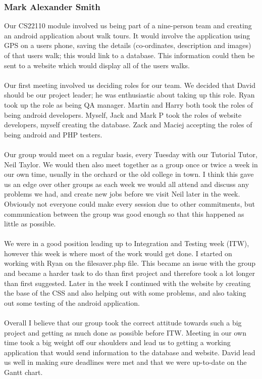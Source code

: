 \documentclass[12pt]{article}
\begin{document}
\subsubsection{Mark Alexander Smith}
Our CS22110 module involved us being part of a nine-person team and creating an android application about walk tours. It would involve the application using GPS on a users phone, saving the details (co-ordinates, description and images) of that users walk; this would link to a database. This information could then be sent to a website which would display all of the users walks.~\\\\ 
Our first meeting involved us deciding roles for our team. We decided that David should be our project leader; he was enthusiastic about taking up this role. Ryan took up the role as being QA manager. Martin and Harry both took the roles of being android developers. Myself, Jack and Mark P took the roles of website developers, myself creating the database. Zack and Maciej accepting the roles of being android and PHP testers.~\\\\
Our group would meet on a regular basis, every Tuesday with our Tutorial Tutor, Neil Taylor.  We would then also meet together as a group once or twice a week in our own time, usually in the orchard or the old college in town. I think this gave us an edge over other groups as each week we would all attend and discuss any problems we had, and create new jobs before we visit Neil later in the week. Obviously not everyone could make every session due to other commitments, but communication between the group was good enough so that this happened as little as possible.~\\\\
We were in a good position leading up to Integration and Testing week (ITW), however this week is where most of the work would get done. I started on working with Ryan on the filesaver.php file. This became an issue with the group and became a harder task to do than first project and therefore took a lot longer than first suggested. Later in the week I continued with the website by creating the base of the CSS and also helping out with some problems, and also taking out some testing of the android application.~\\\\ 
Overall I believe that our group took the correct attitude towards such a big project and getting as much done as possible before ITW. Meeting in our own time took a big weight off our shoulders and lead us to getting a working application that would send information to the database and website. David lead us well in making sure deadlines were met and that we were up-to-date on the Gantt chart.
\end{document}
